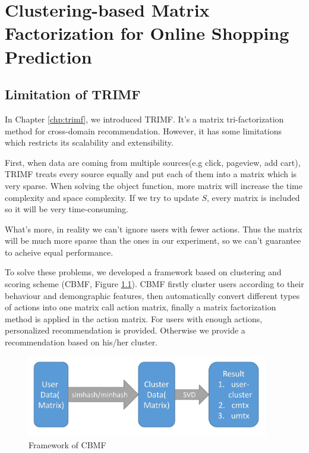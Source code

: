 \chapter{Clustering-based Matrix Factorization for Online Shopping Prediction}
\label{chp:cbmf}
\section{Limitation of TRIMF}
In Chapter \ref{chp:trimf}, we introduced TRIMF. It's a matrix tri-factorization method for cross-domain recommendation. However, it has some limitations which restricts its scalability and extensibility.

First, when data are coming from multiple sources(e.g click, pageview, add cart), TRIMF treats every source equally and put each of them into a matrix which is very sparse. When solving the object function, more matrix will increase the time complexity and space complexity. If we try to update $S$, every matrix is included so it will be very time-consuming.

What's more, in reality we can't ignore users with fewer actions. Thus the matrix will be much more sparse than the ones in our experiment, so we can't guarantee to acheive equal performance.

To solve these problems, we developed a framework based on clustering and scoring scheme (CBMF, Figure \ref{fig:cbmf}). CBMF firstly cluster users according to their behaviour and demongraphic features, then automatically convert different types of actions into one matrix call action matrix, finally a matrix factorization method is applied in the action matrix. For users with enough actions, personalized recommendation is provided. Otherwise we provide a recommendation based on his/her cluster.

\begin{figure}


\begin{center}
\includegraphics[width=400px]{fig/d} 
\caption{Framework of CBMF}
\label{fig:cbmf}
\end{center}
\end{figure}

